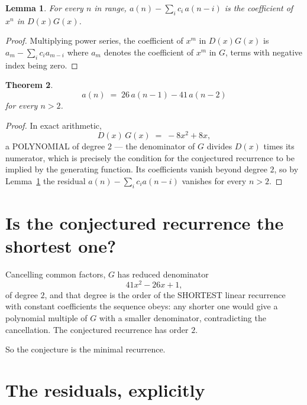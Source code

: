 \documentclass[11pt,a4paper]{article}
\theoremstyle{plain}
\newtheorem{theorem}{Theorem}
\newtheorem{lemma}[theorem]{Lemma}
\theoremstyle{definition}
\begin{document}
\begin{lemma}\label{lem:key}
For every $n$ in range, $a(n)-\sum_i c_i\,a(n-i)$ is the coefficient of $x^{n}$ in
$D(x)G(x)$.
\end{lemma}

\begin{proof}
Multiplying power series, the coefficient of $x^{m}$ in $D(x)G(x)$ is
$a_m-\sum_i c_i a_{m-i}$ where $a_m$ denotes the coefficient of $x^{m}$ in $G$, terms with
negative index being zero.
\end{proof}

\begin{theorem}
\[
a(n)\;=\;26\,a(n-1) - 41\,a(n-2)
\]
for every $n>2$.
\end{theorem}

\begin{proof}
In exact arithmetic,
\[
D(x)\,G(x)\;=\;- 8 x^{2} + 8 x,
\]
a POLYNOMIAL of degree $2$ --- the denominator of $G$ divides $D(x)$ times its numerator,
which is precisely the condition for the conjectured recurrence to be implied by the
generating function. Its coefficients vanish beyond degree $2$, so by
Lemma~\ref{lem:key} the residual $a(n)-\sum_ic_ia(n-i)$ vanishes for every
$n>2$.
\end{proof}

\section{Is the conjectured recurrence the shortest one?}

Cancelling common factors, $G$ has reduced denominator
\[
41 x^{2} - 26 x + 1,
\]
of degree $2$, and that degree is the order of the SHORTEST linear recurrence with
constant coefficients the sequence obeys: any shorter one would give a polynomial multiple of
$G$ with a smaller denominator, contradicting the cancellation. The conjectured recurrence has
order $2$.

So the conjecture is the minimal recurrence.

\section{The residuals, explicitly}
\end{document}
